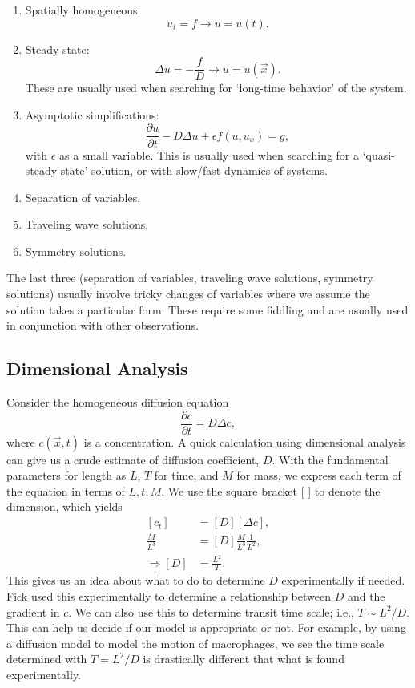 \documentclass[]{article}
\numberwithin{equation}{section}		%
\newcommand{\parD}[2]{\frac{\partial #1}{\partial #2}}
\begin{document}
\begin{enumerate}
\item Spatially homogeneous:
\begin{equation*}
u_t = f \rightarrow u = u(t).
\end{equation*}
\item Steady-state: 
\begin{equation*}
\Delta u = -\frac{f}{D} \rightarrow u = u(\vec{x}). 
\end{equation*}These are usually used when searching for `long-time behavior' of the system.
\item Asymptotic simplifications:
\begin{equation*}
\frac{\partial u}{\partial t} - D \Delta u + \epsilon f(u,u_x)=g,
\end{equation*} with $\epsilon$ as a small variable. This is usually used when searching for a `quasi-steady state' solution, or with slow/fast dynamics of systems. 
\item Separation of variables,
\item Traveling wave solutions,
\item Symmetry solutions. 
\end{enumerate}

The last three (separation of variables, traveling wave solutions, symmetry solutions) usually involve tricky changes of variables where we assume the solution takes a particular form. These require some fiddling and are usually used in conjunction with other observations. 


\subsection{Dimensional Analysis}
Consider the homogeneous diffusion equation
\begin{equation}
  \parD{c}{t} = D \Delta c,
\end{equation}
where $c(\vec{x},t)$ is a concentration. A quick calculation using dimensional analysis can give us a crude estimate of diffusion coefficient, $D$. With the  fundamental parameters for length as $L$, $T$ for time, and $M$ for mass, we express each term of the equation in terms of $L,t,M$.  We use the square bracket [ ] to denote the dimension, which yields
\begin{align*}
\left[c_t \right] &= \left[ D\right] \left[\Delta c\right], \\
\frac{M}{L^3}&=\left[D \right] \frac{M}{L^3}\frac{1}{L^2},\\
\Rightarrow \left[ D\right]&= \frac{L^2}{T}.
\end{align*} This gives us an idea about what to do to determine $D$ experimentally if needed. Fick used this experimentally to determine a relationship between $D$ and the gradient in $c$. We can also use this to determine transit time scale; i.e., $T \sim  L^2/D$. This can help us decide if our model is appropriate or not. For example, by using a diffusion model to model the motion of macrophages, we see the time scale determined with $T=L^2/D$ is drastically different that what is found experimentally.
\end{document}

